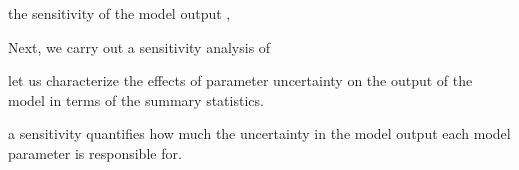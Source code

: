 the sensitivity of the model output , 

Next, we carry out a sensitivity analysis of 

let us characterize the effects of parameter uncertainty on the output of the model in terms of the summary statistics.  

a sensitivity quantifies how much the uncertainty in the model output each model parameter is responsible for. 
